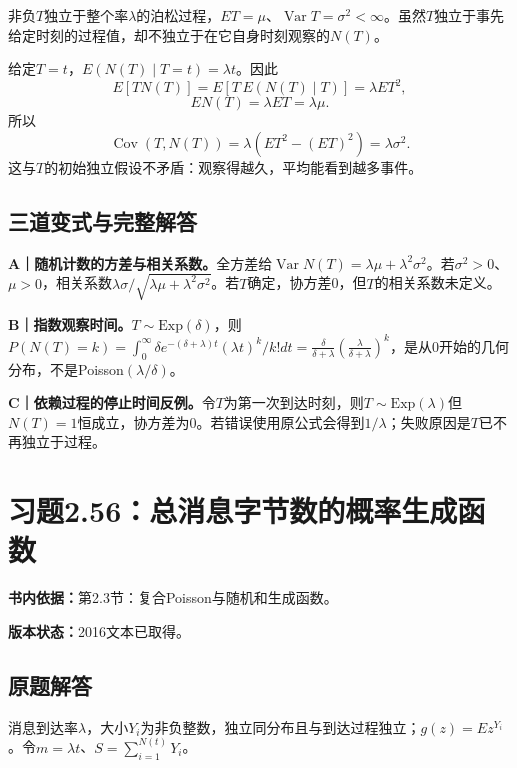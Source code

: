 \documentclass[
  11pt,
  a4paper,
  UTF8,fontset=fandol]{ctexart}
\let\OldSection\section
\renewcommand{\section}{\Needspace{7\baselineskip}\OldSection}
\let\OldSubsection\subsection
\renewcommand{\subsection}{\Needspace{5\baselineskip}\OldSubsection}
\begin{document}
非负\(T\)独立于整个率\(\lambda\)的泊松过程，\(ET=\mu\)、\(\operatorname{Var}T=\sigma^2<\infty\)。虽然\(T\)独立于事先给定时刻的过程值，却不独立于在它自身时刻观察的\(N(T)\)。

给定\(T=t\)，\(E(N(T)\mid T=t)=\lambda t\)。因此
\[E[TN(T)]=E[T\,E(N(T)\mid T)]=\lambda ET^2,\]
\[E N(T)=\lambda ET=\lambda\mu.\] 所以
\[\boxed{\operatorname{Cov}(T,N(T))=\lambda(ET^2-(ET)^2)=\lambda\sigma^2.}\]
这与\(T\)的初始独立假设不矛盾：观察得越久，平均能看到越多事件。

\subsection{三道变式与完整解答}\label{ux4e09ux9053ux53d8ux5f0fux4e0eux5b8cux6574ux89e3ux7b54-54}

\textbf{A｜随机计数的方差与相关系数。}全方差给\(\operatorname{Var}N(T)=\lambda\mu+\lambda^2\sigma^2\)。若\(\sigma^2>0\)、\(\mu>0\)，相关系数\(\lambda\sigma/\sqrt{\lambda\mu+\lambda^2\sigma^2}\)。若\(T\)确定，协方差0，但\(T\)的相关系数未定义。

\textbf{B｜指数观察时间。}\(T\sim\mathrm{Exp}(\delta)\)，则\(P(N(T)=k)=\int_0^\infty\delta e^{-(\delta+\lambda)t}(\lambda t)^k/k!dt=\frac\delta{\delta+\lambda}(\frac\lambda{\delta+\lambda})^k\)，是从0开始的几何分布，不是Poisson\((\lambda/\delta)\)。

\textbf{C｜依赖过程的停止时间反例。}令\(T\)为第一次到达时刻，则\(T\sim\mathrm{Exp}(\lambda)\)但\(N(T)=1\)恒成立，协方差为0。若错误使用原公式会得到\(1/\lambda\)；失败原因是\(T\)已不再独立于过程。

\newpage

\section{习题2.56：总消息字节数的概率生成函数}\label{ux4e60ux98982.56ux603bux6d88ux606fux5b57ux8282ux6570ux7684ux6982ux7387ux751fux6210ux51fdux6570}

\textbf{书内依据：}第2.3节：复合Poisson与随机和生成函数。

\textbf{版本状态：}2016文本已取得。

\subsection{原题解答}\label{ux539fux9898ux89e3ux7b54-55}

消息到达率\(\lambda\)，大小\(Y_i\)为非负整数，独立同分布且与到达过程独立；\(g(z)=Ez^{Y_i}\)。令\(m=\lambda t\)、\(S=\sum_{i=1}^{N(t)}Y_i\)。
\end{document}

